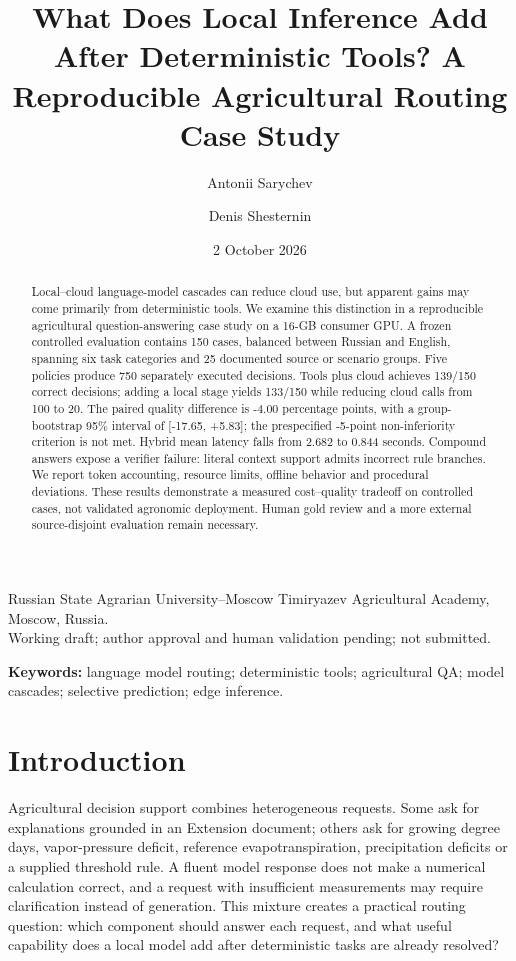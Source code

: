 \documentclass[10pt,a4paper,twocolumn]{article}
\title{What Does Local Inference Add After Deterministic Tools? A Reproducible Agricultural Routing Case Study}
\author{Antonii Sarychev \and Denis Shesternin}
\date{2 October 2026}
\begin{document}
\maketitle
\begin{center}\small
Russian State Agrarian University--Moscow Timiryazev Agricultural Academy, Moscow, Russia.\\
Working draft; author approval and human validation pending; not submitted.
\end{center}
\begin{abstract}
Local--cloud language-model cascades can reduce cloud use, but apparent gains may come primarily from deterministic tools. We examine this distinction in a reproducible agricultural question-answering case study on a 16-GB consumer GPU. A frozen controlled evaluation contains 150 cases, balanced between Russian and English, spanning six task categories and 25 documented source or scenario groups. Five policies produce 750 separately executed decisions. Tools plus cloud achieves 139/150 correct decisions; adding a local stage yields 133/150 while reducing cloud calls from 100 to 20. The paired quality difference is -4.00 percentage points, with a group-bootstrap 95\% interval of [-17.65, +5.83]; the prespecified -5-point non-inferiority criterion is not met. Hybrid mean latency falls from 2.682 to 0.844 seconds. Compound answers expose a verifier failure: literal context support admits incorrect rule branches. We report token accounting, resource limits, offline behavior and procedural deviations. These results demonstrate a measured cost--quality tradeoff on controlled cases, not validated agronomic deployment. Human gold review and a more external source-disjoint evaluation remain necessary.
\end{abstract}
\noindent\textbf{Keywords:} language model routing; deterministic tools; agricultural QA; model cascades; selective prediction; edge inference.

\section{Introduction}

Agricultural decision support combines heterogeneous requests. Some ask for explanations grounded in an Extension document; others ask for growing degree days, vapor-pressure deficit, reference evapotranspiration, precipitation deficits or a supplied threshold rule. A fluent model response does not make a numerical calculation correct, and a request with insufficient measurements may require clarification instead of generation. This mixture creates a practical routing question: which component should answer each request, and what useful capability does a local model add after deterministic tasks are already resolved?
\end{document}

